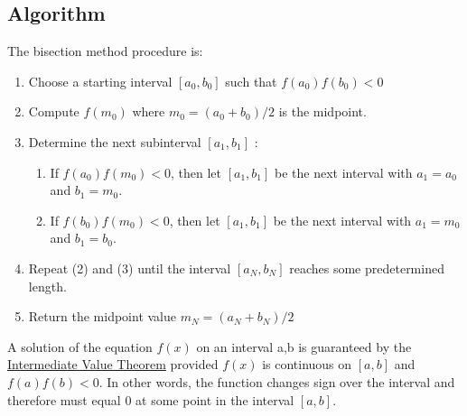 \documentclass[a4paper, 12pt, reqno]{article}
\begin{document}
\subsection{Algorithm}
The bisection method procedure is:
\begin{enumerate}
  \item Choose a starting interval $[a_0,b_0]$ such that $f(a_0)f(b_0)<0$
  \item Compute $f(m_0)$ where $m_0=(a_0+b_0)/2$ is the midpoint.
  \item Determine the next subinterval $[a_1,b_1]$ :
	\begin{enumerate}
       \item If $f(a_0)f(m_0)<0$, then let $[a_1,b_1]$  be the next interval with $a_1=a_0$ and $b_1=m_0$.
       \item If $f(b_0)f(m_0)<0$, then let $[a_1,b_1]$  be the next interval with $a_1=m_0$ and $b_1=b_0$.
	\end{enumerate}
\item Repeat (2) and (3) until the interval $[a_N,b_N]$ reaches some predetermined length.
\item Return the midpoint value $m_N=(a_N+b_N)/2$
\end{enumerate}
A solution of the equation $f(x)$ on an interval a,b is guaranteed by the \underline{Intermediate Value Theorem} provided $f(x)$ is continuous on $[a,b]$ and \\$f(a)f(b)<0$. In other words, the function changes sign over the interval and therefore must equal 0 at some point in the interval $[a,b]$.
\end{document}
